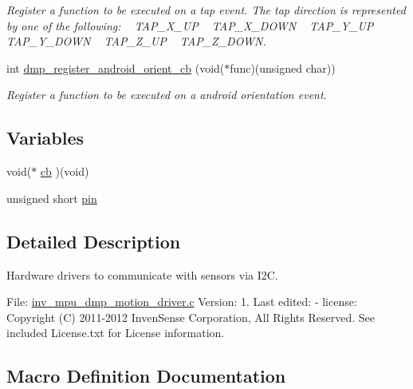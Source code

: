 \begin{DoxyCompactItemize}
\begin{DoxyCompactList}\small\item\em Register a function to be executed on a tap event. The tap direction is represented by one of the following\+: ~\newline
 T\+A\+P\+\_\+\+X\+\_\+\+UP ~\newline
 T\+A\+P\+\_\+\+X\+\_\+\+D\+O\+WN ~\newline
 T\+A\+P\+\_\+\+Y\+\_\+\+UP ~\newline
 T\+A\+P\+\_\+\+Y\+\_\+\+D\+O\+WN ~\newline
 T\+A\+P\+\_\+\+Z\+\_\+\+UP ~\newline
 T\+A\+P\+\_\+\+Z\+\_\+\+D\+O\+WN. \end{DoxyCompactList}\item 
int \hyperlink{group___d_r_i_v_e_r_s_ga2e66a02d29ec89466cf339587592943c}{dmp\+\_\+register\+\_\+android\+\_\+orient\+\_\+cb} (void($\ast$func)(unsigned char))
\begin{DoxyCompactList}\small\item\em Register a function to be executed on a android orientation event. \end{DoxyCompactList}\end{DoxyCompactItemize}
\subsection*{Variables}
\begin{DoxyCompactItemize}
\item 
void($\ast$ \hyperlink{group___d_r_i_v_e_r_s_ga574999a803893e57b48324e39a5daa19}{cb} )(void)
\item 
unsigned short \hyperlink{group___d_r_i_v_e_r_s_ga503508a7ee88d8566cb3c882db1311b2}{pin}
\end{DoxyCompactItemize}


\subsection{Detailed Description}
Hardware drivers to communicate with sensors via I2C. 

File\+: \hyperlink{inv__mpu__dmp__motion__driver_8c}{inv\+\_\+mpu\+\_\+dmp\+\_\+motion\+\_\+driver.\+c} Version\+: 1. Last edited\+: -\/ license\+: Copyright (C) 2011-\/2012 Inven\+Sense Corporation, All Rights Reserved. See included License.\+txt for License information. 

\subsection{Macro Definition Documentation}

